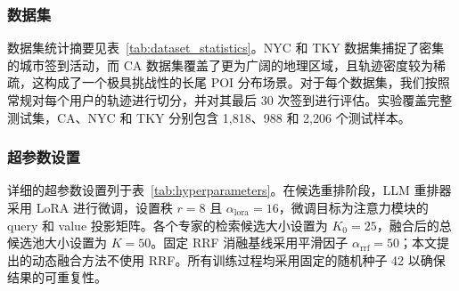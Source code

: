 \documentclass[10pt,fontset=none,twocolumn]{ctexart}
\begin{document}
\subsubsection{数据集}
数据集统计摘要见表~\ref{tab:dataset_statistics}。NYC 和 TKY 数据集捕捉了密集的城市签到活动，而 CA 数据集覆盖了更为广阔的地理区域，且轨迹密度较为稀疏，这构成了一个极具挑战性的长尾 POI 分布场景。对于每个数据集，我们按照常规对每个用户的轨迹进行切分，并对其最后 30 次签到进行评估。实验覆盖完整测试集，CA、NYC 和 TKY 分别包含 1,818、988 和 2,206 个测试样本。

\begin{table}[!h]
\centering
\caption{系统超参数设置}
\label{tab:hyperparameters}
\end{table}

\subsubsection{超参数设置}
详细的超参数设置列于表~\ref{tab:hyperparameters}。在候选重排阶段，LLM 重排器采用 LoRA 进行微调，设置秩 $r=8$ 且 $\alpha_{\mathrm{lora}}=16$，微调目标为注意力模块的 query 和 value 投影矩阵。各个专家的检索候选大小设置为 $K_0=25$，融合后的总候选池大小设置为 $K=50$。固定 RRF 消融基线采用平滑因子 $\alpha_{\mathrm{rrf}}=50$；本文提出的动态融合方法不使用 RRF。所有训练过程均采用固定的随机种子 42 以确保结果的可重复性。
\end{document}
